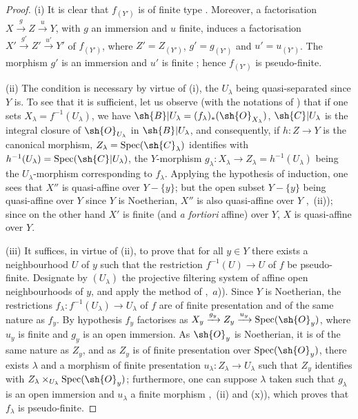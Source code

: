 \begin{proof}
(i) It is clear that $f_{(Y')}$ is of finite type . Moreover, a factorisation $X\xrightarrow{g}Z\xrightarrow{u}Y$, with $g$ an immersion and $u$ finite, induces a factorisation $X'\xrightarrow{g'}Z'\xrightarrow{u'}Y'$ of $f_{(Y')}$, where $Z'=Z_{(Y')}$, $g'=g_{(Y')}$ and $u'=u_{(Y')}$. The morphism $g'$ is an immersion  and $u'$ is finite ; hence $f_{(Y')}$ is pseudo-finite.

(ii) The condition is necessary by virtue of (i), the $U_\lambda$ being quasi-separated since $Y$ is.
To see that it is sufficient, let us observe (with the notations of ) that if one sets $X_\lambda=f^{-1}(U_\lambda)$, we have $\sh{B}|U_\lambda=(f_\lambda)_*(\sh{O}_{X_\lambda})$, $\sh{C}|U_\lambda$ is the integral closure of $\sh{O}_{U_\lambda}$ in $\sh{B}|U_\lambda$, and consequently, if $h:Z\to Y$ is the canonical morphism, $Z_\lambda=\operatorname{Spec}(\sh{C}_\lambda)$ identifies with $h^{-1}(U_\lambda)=\operatorname{Spec}(\sh{C}|U_\lambda)$, the $Y$-morphism $g_\lambda:X_\lambda\to Z_\lambda=h^{-1}(U_\lambda)$ being the $U_\lambda$-morphism corresponding to $f_\lambda$.
Applying the hypothesis of induction, one sees that $X''$ is quasi-affine over $Y-\{y\}$; but the open subset $Y-\{y\}$ being quasi-affine over $Y$ since $Y$ is Noetherian, $X''$ is also quasi-affine over $Y$ ,~(ii)); since on the other hand $X'$ is finite (and \emph{a fortiori} affine) over $Y$, $X$ is quasi-affine over $Y$.

(iii) It suffices, in virtue of (ii), to prove that for all $y\in Y$ there exists a neighbourhood $U$ of $y$ such that the restriction $f^{-1}(U)\to U$ of $f$ be pseudo-finite.
Designate by $(U_\lambda)$ the projective filtering system of affine open neighbourhoods of $y$, and apply the method of ,~$a$)).
Since $Y$ is Noetherian, the restrictions $f_\lambda:f^{-1}(U_\lambda)\to U_\lambda$ of $f$ are of finite presentation and of the same nature as $f_y$.
By hypothesis $f_y$ factorises as $X_y\xrightarrow{g_y}Z_y\xrightarrow{u_y}\operatorname{Spec}(\sh{O}_y)$, where $u_y$ is finite and $g_y$ is an open immersion.
As $\sh{O}_y$ is Noetherian, it is of the same nature as $Z_y$, and as $Z_y$ is of finite presentation over $\operatorname{Spec}(\sh{O}_y)$, there exists $\lambda$ and a morphism of finite presentation $u_\lambda:Z_\lambda\to U_\lambda$ such that $Z_y$ identifies with $Z_\lambda\times_{U_\lambda}\operatorname{Spec}(\sh{O}_y)$; furthermore, one can suppose $\lambda$ taken such that $g_\lambda$ is an open immersion and $u_\lambda$ a finite morphism ,~(ii) and (x)), which proves that $f_\lambda$ is pseudo-finite.
\end{proof}

